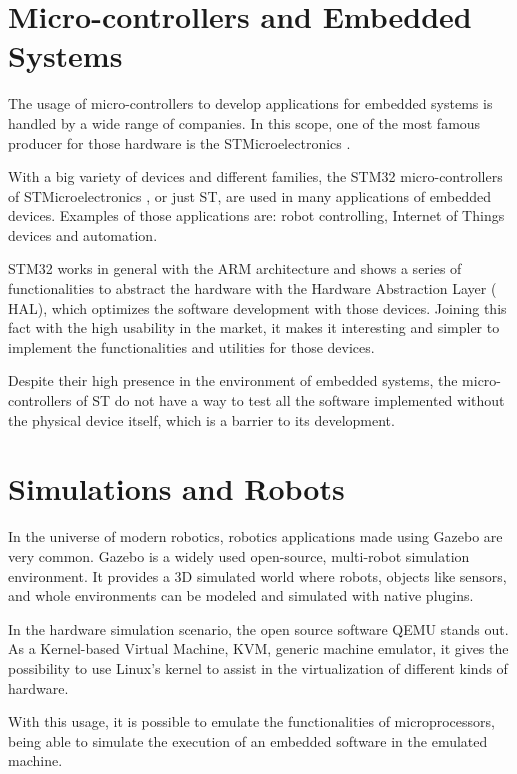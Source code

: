 \documentclass[../../monografia.tex]{subfiles}
\begin{document}
\section{Micro-controllers and Embedded Systems}

The usage of micro-controllers to develop applications for embedded systems is handled by a wide range of companies. In this scope, one of the most famous producer for those hardware is the STMicroelectronics \cite{STMicroelectronics_23}.

With a big variety of devices and different families, the STM32 micro-controllers of STMicroelectronics , or just ST, are used in many applications of embedded devices. Examples of those applications are: robot controlling, Internet of Things devices and automation.

STM32 works in general with the ARM architecture and shows a series of functionalities to abstract the hardware with the Hardware Abstraction Layer ( HAL), which optimizes the software development with those devices. Joining this fact with the high usability in the market, it makes it interesting and simpler to implement the functionalities and utilities for those devices.

Despite their high presence in the environment of embedded systems, the micro-controllers of ST do not have a way to test all the software implemented without the physical device itself, which is a barrier to its development.

\section{Simulations and Robots}

In the universe of modern robotics, robotics applications made using Gazebo are very common. Gazebo is a widely used open-source, multi-robot simulation environment. It provides a 3D simulated world where robots, objects like sensors, and whole environments can be modeled and simulated with native plugins.

In the hardware simulation scenario, the open source software QEMU stands out. As a Kernel-based Virtual Machine, KVM, generic machine emulator, it gives the possibility to use Linux’s kernel to assist in the virtualization of different kinds of hardware.

With this usage, it is possible to emulate the functionalities of microprocessors, being able to simulate the execution of an embedded software in the emulated machine.
\end{document}
